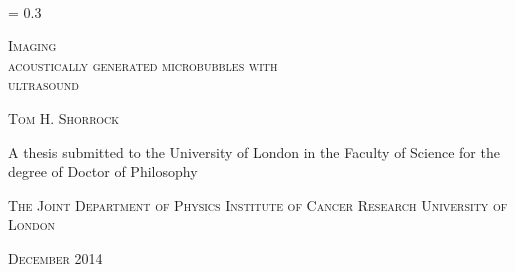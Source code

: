 


\newcommand*{\titleEI}{\begingroup%
\FSfont{5gl}%
\drop = 0.3\textheight
\vspace*{\drop}
\raggedright
{\LARGE {\huge C}ONUNDRUMS \textit{and} \\
\hspace*{30pt} {\huge E}NIGMAS\par}
\vspace{2\baselineskip}
{\large\ltseries\hspace*{15pt} {\LARGE T}WENTY {\LARGE Y}EARS \\[.1\baselineskip]
\hspace*{15pt} OF {\LARGE P}UZZLEMENTS}\par
\vspace{2\baselineskip}
\hspace*{15pt}{\ltseries \textit{\large {\footnotesize BY} The Author}}\par
\vfill
The Publisher {\footnotesize YEAR}
\endgroup}



\mbox{  }
\begin{center}
\drop = 0.3\textheight
\vspace*{\drop}
\vspace{10mm}
\LARGE
\raggedright
{\textsc{\hspace*{223pt}Imaging \\acoustically  generated microbubbles  {\large{with}}\\ \hspace*{198pt}ultrasound}}

\vspace{10mm}
\large
{\textsc{\hspace*{190pt}Tom H. Shorrock}}

\vspace{25mm}\vfill
\large
\hspace*{40.5pt}A thesis submitted to the University of London in the \linebreak
\hspace*{24pt}Faculty of Science for the degree of Doctor of Philosophy \linebreak
\vspace{20mm}\vfill


\vspace{2mm}
\large
{\textsc{\hspace*{112pt}The Joint Department of Physics  \linebreak
\hspace*{124pt}Institute of Cancer Research \linebreak
\hspace*{165pt}University of London
}}

\vspace{2mm}

\large
{\textsc{\hspace*{202pt}December 2014}}

\end{center}


